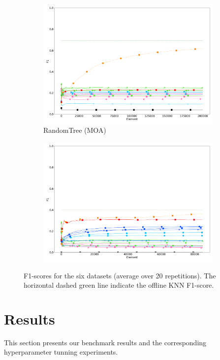 \begin{figure}
\begin{subfigure}[t]{.49\linewidth}
		\includegraphics[width=\linewidth]{figures/results/dataset_3_f1.png}
		\caption{RandomTree (MOA)}
		\label{fig:f1-dataset_3}
	\end{subfigure}
	\begin{subfigure}[t]{.49\linewidth}
		\includegraphics[width=\linewidth]{figures/results/recofit_6_f1.png}
		\caption{\recofitdataset}
		\label{fig:f1-recofit}
	\end{subfigure}
	\caption{F1-scores for the six datasets (average over 20 repetitions). The horizontal dashed green line indicate the offline KNN F1-score.}
	\label{fig:f1}
\end{figure}

\section{Results}
This section presents our benchmark results and the corresponding
hyperparameter tunning experiments.

